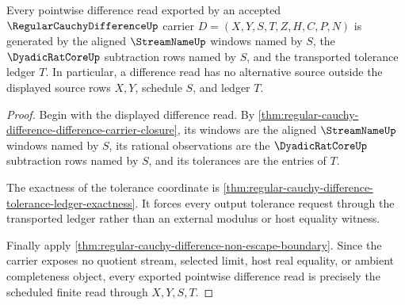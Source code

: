 \begin{theorem}
\label{thm:regular-cauchy-difference-schedule-exactness}
Every pointwise difference read exported by an accepted $\RegularCauchyDifferenceUp$ carrier $D=(X,Y,S,T,Z,H,C,P,N)$ is generated by the aligned $\StreamNameUp$ windows named by $S$, the $\DyadicRatCoreUp$ subtraction rows named by $S$, and the transported tolerance ledger $T$. In particular, a difference read has no alternative source outside the displayed source rows $X,Y$, schedule $S$, and ledger $T$.
\end{theorem}
\begin{proof}
Begin with the displayed difference read. By \autoref{thm:regular-cauchy-difference-difference-carrier-closure}, its windows are the aligned $\StreamNameUp$ windows named by $S$, its rational observations are the $\DyadicRatCoreUp$ subtraction rows named by $S$, and its tolerances are the entries of $T$.

The exactness of the tolerance coordinate is \autoref{thm:regular-cauchy-difference-tolerance-ledger-exactness}. It forces every output tolerance request through the transported ledger rather than an external modulus or host equality witness.

Finally apply \autoref{thm:regular-cauchy-difference-non-escape-boundary}. Since the carrier exposes no quotient stream, selected limit, host real equality, or ambient completeness object, every exported pointwise difference read is precisely the scheduled finite read through $X,Y,S,T$.
\end{proof}

